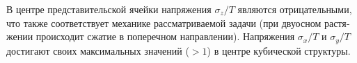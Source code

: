 \begin{russian}
В центре представительской ячейки напряжения $\sigma_z/T$ являются отрицательными, что также соответствует механике рассматриваемой задачи (при двуосном растяжении происходит сжатие в поперечном направлении). Напряжения $\sigma_x/T$ и $\sigma_y/T$ достигают своих максимальных значений ($>1$) в центре кубической структуры.

%




\end{russian}
